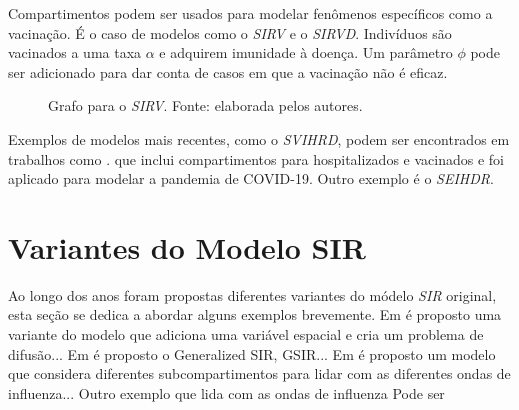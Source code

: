 Compartimentos podem ser usados para modelar fenômenos específicos como a vacinação.
É o caso de modelos como o \textit{SIRV} \cite{schlickeiser-kroger:21-sirv} 
e o \textit{SIRVD}. Indivíduos são vacinados a uma taxa $\alpha$ e adquirem imunidade
à doença. Um parâmetro $\phi$ pode ser adicionado para dar conta de casos em que
a vacinação não é eficaz. 

\begin{figure}[H]
\centering
{}
\caption{Grafo para o \textit{SIRV}. Fonte: elaborada pelos autores.}
\label{fig:sirv-grafo}
\end{figure}

Exemplos de modelos mais recentes, como o \textit{SVIHRD}, podem ser encontrados
em trabalhos como \cite{nelson-etal:24-japao}.
que inclui compartimentos para hospitalizados e vacinados e foi aplicado para 
modelar a pandemia de COVID-19. Outro exemplo é o \textit{SEIHDR}. 

\section{Variantes do Modelo SIR}

Ao longo dos anos foram propostas diferentes variantes do módelo \textit{SIR} original,
esta seção se dedica a abordar alguns exemplos brevemente. 
Em \cite{noble:1974-sir-difusao} é proposto uma variante do modelo que adiciona
uma variável espacial e cria um problema de difusão... 
Em \cite{singh-gupta:2022-generalized-sir} é proposto o Generalized SIR, GSIR...
Em \cite{andreu-vilarroig-etal:2025-sugestao-beta-t} é proposto um modelo que 
considera diferentes subcompartimentos para lidar com as diferentes ondas de 
influenza...
Outro exemplo que lida com as ondas de influenza \cite{lin:2003-sir-influenza}
Pode ser \cite{krylova:2013-sir-erlang}
    

